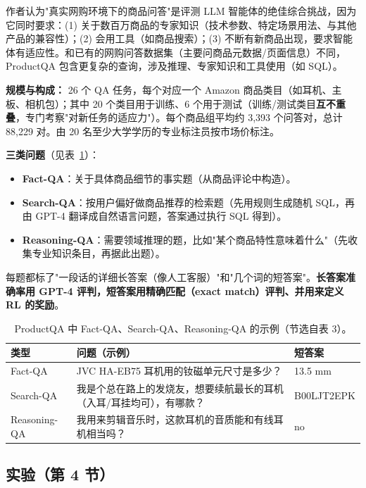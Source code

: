 \documentclass[11pt,UTF8,fontset=fandol]{ctexart}
\begin{document}
作者认为"真实网购环境下的商品问答"是评测 LLM 智能体的绝佳综合挑战，因为它同时要求：(1) 关于数百万商品的专家知识（技术参数、特定场景用法、与其他产品的兼容性）；(2) 会用工具（如商品搜索）；(3) 不断有新商品出现，要求智能体有适应性。和已有的网购问答数据集（主要问商品元数据/页面信息）不同，ProductQA 包含更复杂的查询，涉及推理、专家知识和工具使用（如 SQL）。

\textbf{规模与构成：} 26 个 QA 任务，每个对应一个 Amazon 商品类目（如耳机、主板、相机包）；其中 20 个类目用于训练、6 个用于测试（训练/测试类目\textbf{互不重叠}，专门考察"对新任务的适应力"）。每个商品组平均约 3{,}393 个问答对，总计 88{,}229 对。由 20 名至少大学学历的专业标注员按市场价标注。

\textbf{三类问题}（见表~\ref{tab:qatype}）：
\begin{itemize}[leftmargin=1.5em]
\item \textbf{Fact-QA}：关于具体商品细节的事实题（从商品评论中构造）。
\item \textbf{Search-QA}：按用户偏好做商品推荐的检索题（先用规则生成随机 SQL，再由 GPT-4 翻译成自然语言问题，答案通过执行 SQL 得到）。
\item \textbf{Reasoning-QA}：需要领域推理的题，比如"某个商品特性意味着什么"（先收集专业知识条目，再据此出题）。
\end{itemize}
每题都标了"一段话的详细长答案（像人工客服）"和"几个词的短答案"。\textbf{长答案准确率用 GPT-4 评判，短答案用精确匹配（exact match）评判、并用来定义 RL 的奖励}。

\begin{table}[H]\centering
\caption{ProductQA 中 Fact-QA、Search-QA、Reasoning-QA 的示例（节选自表 3）。}
\label{tab:qatype}
\small
\begin{tabular}{p{1.6cm} p{6.2cm} p{2.2cm}}
\toprule
类型 & 问题（示例） & 短答案 \\ \midrule
Fact-QA & JVC HA-EB75 耳机用的钕磁单元尺寸是多少？ & 13.5 mm \\
Search-QA & 我是个总在路上的发烧友，想要续航最长的耳机（入耳/耳挂均可），有哪款？ & B00LJT2EPK \\
Reasoning-QA & 我用来剪辑音乐时，这款耳机的音质能和有线耳机相当吗？ & no \\
\bottomrule
\end{tabular}
\end{table}

\subsection{实验（第 4 节）}
\end{document}
